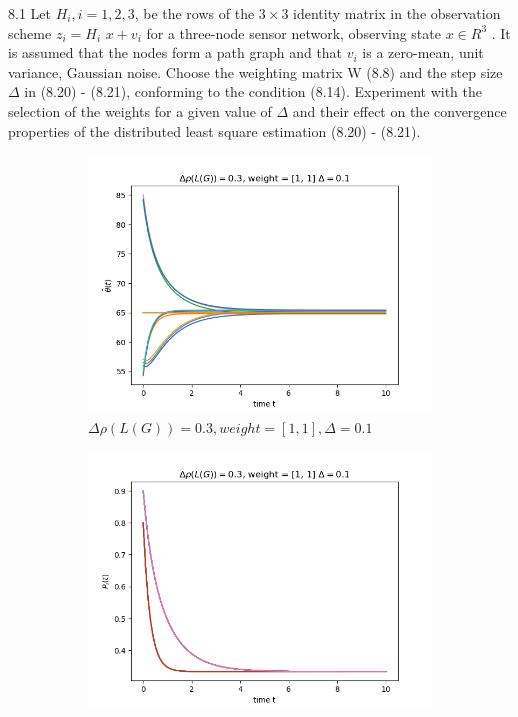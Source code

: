 \documentclass{article}
\begin{document}
\begin{problem} 8.1
    Let $H_i , i = 1, 2, 3$, be the rows of the $3 \times 3$ identity matrix in the observation scheme $z_i = H_i$ $x + v_i$ for a three-node sensor network, observing state $x \in R^3$ . It is assumed that the nodes form a path graph and that $v_i$ is a zero-mean, unit variance, Gaussian noise. Choose the weighting matrix W (8.8) and the step size $\Delta$ in (8.20) - (8.21), conforming to the condition (8.14). Experiment with the selection of the weights for a given value of $\Delta$ and their effect on the convergence properties of the distributed least square estimation (8.20) - (8.21).
    \begin{figure}[!h]
        \centering
        \begin{subfigure}{0.4\textwidth}
            \includegraphics[width=\textwidth]{./img/Figure_0.png}
            \caption{$\Delta \rho (L(G)) = 0.3, weight = [1,1], \Delta = 0.1$}
        \end{subfigure}
        \begin{subfigure}{0.4\textwidth}
            \includegraphics[width=\textwidth]{./img/Figure_1.png}

\end{subfigure}
\end{figure}
\end{problem}
\end{document}
